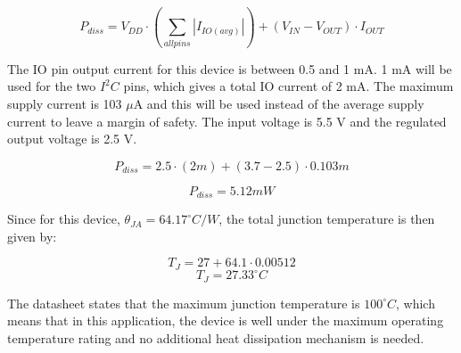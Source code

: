 \[P_{diss} = V_{DD} \cdot \left(\sum_{allpins} |I_{IO(avg)}| \right) + \left(V_{IN} - V_{OUT}\right)\cdot I_{OUT}\]

The IO pin output current for this device is between 0.5 and 1 mA.  1 mA will be used for the two $I^2C$ pins, which gives a total IO current of 2 mA.  The maximum supply current is 103 $\mu$A and this will be used instead of the average supply current to leave a margin of safety.  The input voltage is 5.5 V and the regulated output voltage is 2.5 V.

\[P_{diss} = 2.5 \cdot \left(2m \right) + \left(3.7 - 2.5\right)\cdot 0.103m\]

\[\boxed{P_{diss} = 5.12 mW}\]

Since for this device, $\theta_{JA} = 64.17^\circ C/W$, the total junction temperature is then given by:

\[T_J = 27 + 64.1 \cdot 0.00512 \]
\[\boxed{T_J = 27.33 ^\circ C}\]

The datasheet states that the maximum junction temperature is $100^\circ C$, which means that in this application, the device is well under the maximum operating temperature rating and no additional heat dissipation mechanism is needed.

